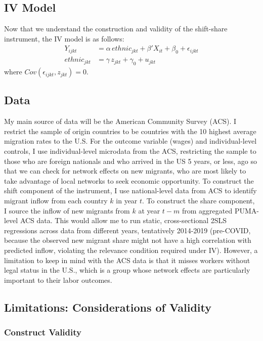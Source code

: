 \documentclass[11pt]{article}
\begin{document}
\subsection{IV Model}

Now that we understand the construction and validity of the shift-share instrument, the IV model is as follows:
\begin{align*}
    Y_{ijkt}&=\alpha \,ethnic_{jkt} + \beta'X_{it}+\beta_0+\epsilon_{ijkt}\\
    ethnic_{jkt}&=\gamma \, z_{jkt} +\gamma_0 +  u_{jkt}
\end{align*}
where $Cov(\epsilon_{ijkt}, z_{jkt})=0$.  


\subsection{Data}
My main source of data will be the American Community Survey (ACS). I restrict the sample of origin countries to be countries with the 10 highest average migration rates to the U.S. For the outcome variable (wages) and individual-level controls, I use individual-level microdata from the ACS, restricting the sample to those who are foreign nationals and who arrived in the US 5 years, or less, ago so that we can check for network effects on new migrants, who are most likely to take advantage of local networks to seek economic opportunity. To construct the shift component of the instrument, I use national-level data from ACS to identify migrant inflow from each country $k$ in year $t$. To construct the share component, I source the inflow of new migrants from $k$ at year $t-m$ from aggregated PUMA-level ACS data. This would allow me to run static, cross-sectional 2SLS regressions across data from different years, tentatively 2014-2019 (pre-COVID, because the observed new migrant share might not have a high correlation with predicted inflow, violating the relevance condition required under IV). However, a limitation to keep in mind  with the ACS data is that it misses workers without legal status in the U.S., which is a group whose network effects are particularly important to their labor outcomes. 

\subsection{Limitations: Considerations of Validity}
\subsubsection{Construct Validity}
\end{document}

